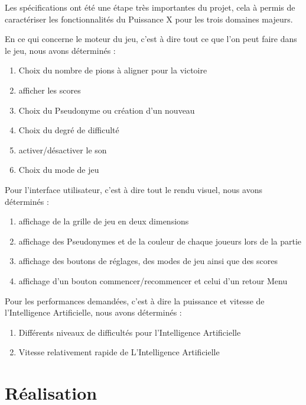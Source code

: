 \documentclass[a4paper,oneside]{article}
\begin{document}
Les spécifications ont été une étape très importantes du projet, cela à permis de caractériser les fonctionnalités du Puissance X pour les trois domaines majeurs.

\vspace{0.5cm}

En ce qui concerne le moteur du jeu, c'est à dire tout ce que l'on peut faire dans le jeu, nous avons déterminés :
\begin{enumerate}
    \item Choix du nombre de pions à aligner pour la victoire 
    \item afficher les scores
    \item Choix du Pseudonyme ou création d'un nouveau
    \item Choix du degré de difficulté
    \item activer/désactiver le son
    \item Choix du mode de jeu
\end{enumerate}
\vspace{0.5cm}


Pour l'interface utilisateur, c'est à dire tout le rendu visuel, nous avons déterminés :
\begin{enumerate}
	\item affichage de la grille de jeu en deux dimensions
	\item affichage des Pseudonymes et de la couleur de chaque joueurs lors de la partie
	\item affichage des boutons de réglages, des modes de jeu ainsi que des scores
	\item affichage d'un bouton commencer/recommencer et celui d'un retour Menu
\end{enumerate}
\vspace{0.5cm}

Pour les performances demandées, c'est à dire la puissance et vitesse de l'Intelligence Artificielle, nous avons déterminés :
\begin{enumerate}
	\item Différents niveaux de difficultés pour l'Intelligence Artificielle
	\item Vitesse relativement rapide de L'Intelligence Artificielle
\end{enumerate}


\clearpage




\section{Réalisation} 
\end{document}
